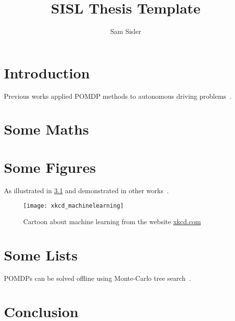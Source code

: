 \documentclass[12pt,letterpaper]{report}
\title{SISL Thesis Template}
\author{Sam Sisler}
\begin{document}
\beforepreface


\Blindtext


\Blindtext

\afterpreface

\chapter{Introduction}

\Blindtext
Previous works applied POMDP methods to autonomous driving problems~\cite{bai2014}.

\chapter{Some Maths}

\blindmathpaper

\chapter{Some Figures}

\Blindtext
As illustrated in \cref{fig:ml} and demonstrated in other works~\cite{mnih2015}.

\begin{figure}[h]
    \centering
    \texttt{[image: xkcd\_machinelearning]}
    \caption[Cartoon about machine learning]{Cartoon about machine learning from the website \url{xkcd.com}}
    \label{fig:ml}
\end{figure}

\Blindtext


\chapter{Some Lists}

\blindtext

\blindenumerate

\blindtext

POMDPs can be solved offline using Monte-Carlo tree search~\cite{silver2010}.

\blinditemize

\blindtext

\blinddescription

\chapter{Conclusion}

\blindtext

\printbibliography
\end{document}
